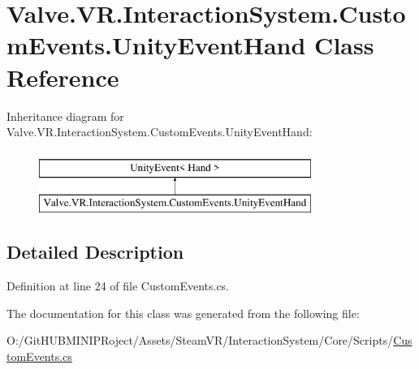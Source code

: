\hypertarget{class_valve_1_1_v_r_1_1_interaction_system_1_1_custom_events_1_1_unity_event_hand}{}\section{Valve.\+V\+R.\+Interaction\+System.\+Custom\+Events.\+Unity\+Event\+Hand Class Reference}
\label{class_valve_1_1_v_r_1_1_interaction_system_1_1_custom_events_1_1_unity_event_hand}
Inheritance diagram for Valve.\+V\+R.\+Interaction\+System.\+Custom\+Events.\+Unity\+Event\+Hand\+:\begin{figure}[H]
\begin{center}
\leavevmode
\includegraphics[height=2.000000cm]{class_valve_1_1_v_r_1_1_interaction_system_1_1_custom_events_1_1_unity_event_hand}
\end{center}
\end{figure}


\subsection{Detailed Description}


Definition at line 24 of file Custom\+Events.\+cs.



The documentation for this class was generated from the following file\+:\begin{DoxyCompactItemize}
\item 
O\+:/\+Git\+H\+U\+B\+M\+I\+N\+I\+P\+Roject/\+Assets/\+Steam\+V\+R/\+Interaction\+System/\+Core/\+Scripts/\mbox{\hyperlink{_custom_events_8cs}{Custom\+Events.\+cs}}\end{DoxyCompactItemize}
